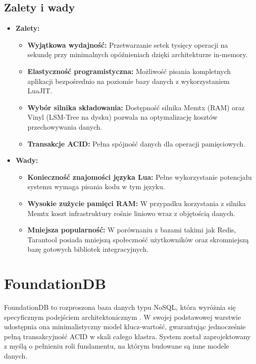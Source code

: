 \subsection{Zalety i wady}
\begin{itemize}
    \item \textbf{Zalety:}
    \begin{itemize}
        \item \textbf{Wyjątkowa wydajność:} Przetwarzanie setek tysięcy operacji na sekundę przy minimalnych opóźnieniach dzięki architekturze in-memory.
        \item \textbf{Elastyczność programistyczna:} Możliwość pisania kompletnych aplikacji bezpośrednio na poziomie bazy danych z wykorzystaniem LuaJIT.
        \item \textbf{Wybór silnika składowania:} Dostępność silnika Memtx (RAM) oraz Vinyl (LSM-Tree na dysku) pozwala na optymalizację kosztów przechowywania danych.
        \item \textbf{Transakcje ACID:} Pełna spójność danych dla operacji pamięciowych.
    \end{itemize}
    \item \textbf{Wady:}
    \begin{itemize}
        \item \textbf{Konieczność znajomości języka Lua:} Pełne wykorzystanie potencjału systemu wymaga pisania kodu w tym języku.
        \item \textbf{Wysokie zużycie pamięci RAM:} W przypadku korzystania z silnika Memtx koszt infrastruktury rośnie liniowo wraz z objętością danych.
        \item \textbf{Mniejsza popularność:} W porównaniu z bazami takimi jak Redis, Tarantool posiada mniejszą społeczność użytkowników oraz skromniejszą bazę gotowych bibliotek integracyjnych.
    \end{itemize}
\end{itemize}

\section{FoundationDB}
FoundationDB to rozproszona baza danych typu NoSQL, która wyróżnia się specyficznym podejściem architektonicznym \cite{zhou2021}. W swojej podstawowej warstwie udostępnia ona minimalistyczny model klucz-wartość, gwarantując jednocześnie pełną transakcyjność ACID w skali całego klastra. System został zaprojektowany z myślą o pełnieniu roli fundamentu, na którym budowane są inne modele danych.

